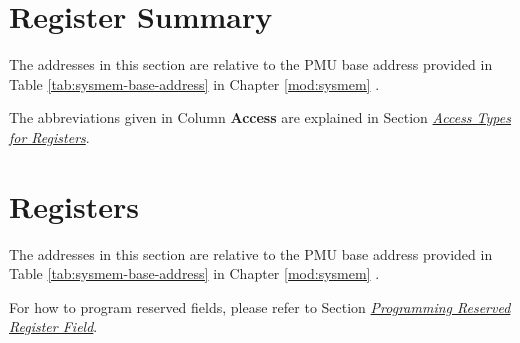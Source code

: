 \documentclass[main\_\_EN.tex]{subfiles}
\begin{document}
\clearpage
\section{Register Summary}\hypertarget{lowpowm-reg-summ}{}\label{sec:lowpowm-reg-summ}

The addresses in this section are relative to the PMU base address provided in Table \ref{tab:sysmem-base-address} in Chapter \ref{mod:sysmem} \textit{}.

The abbreviations given in Column \textbf{Access} are explained in Section \hyperref[glossary-access-types]{\textit{Access Types for Registers}}.



\section{Registers}

The addresses in this section are relative to the PMU base address provided in Table \ref{tab:sysmem-base-address} in Chapter \ref{mod:sysmem} \textit{}.

For how to program reserved fields, please refer to Section \hyperref[programming-reserved-field]{\textit{Programming Reserved Register Field}}.

\end{document}
